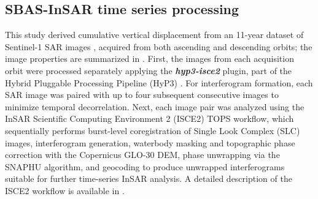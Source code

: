 
\subsection{SBAS-InSAR time series processing}
\label{subsec:sbas}

This study derived cumulative vertical displacement from an 11-year dataset of Sentinel-1 SAR images , acquired from both ascending and descending orbits; the image properties are summarized in . First, the images from each acquisition orbit were processed separately applying the \textbf{\textit{hyp3-isce2}} plugin, part of the Hybrid Pluggable Processing Pipeline (HyP3) \citep{hogenson_hybrid_2025}. For interferogram formation, each SAR image was paired with up to four subsequent consecutive images to minimize temporal decorrelation. Next, each image pair was analyzed using the InSAR Scientific Computing Environment 2 (ISCE2) TOPS workflow, which sequentially performs burst-level coregistration of Single Look Complex (SLC) images, interferogram generation, waterbody masking and topographic phase correction with the Copernicus GLO-30 DEM, phase unwrapping via the SNAPHU algorithm, and geocoding to produce unwrapped interferograms suitable for further time-series InSAR analysis. A detailed description of the ISCE2 workflow is available in \citep{rosen_insar_2012, yague-martinez_interferometric_2016, fattahi_network-based_2017}.

